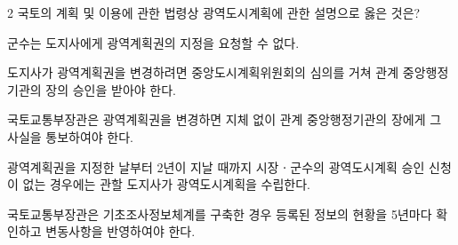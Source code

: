 \begin{question}{2}
국토의 계획 및 이용에 관한 법령상 광역도시계획에 관한 설명으로 옳은 것은?
\begin{choices}
  \item 군수는 도지사에게 광역계획권의 지정을 요청할 수 없다.
  \item 도지사가 광역계획권을 변경하려면 중앙도시계획위원회의 심의를 거쳐 관계 중앙행정기관의 장의 승인을 받아야 한다.
  \item 국토교통부장관은 광역계획권을 변경하면 지체 없이 관계 중앙행정기관의 장에게 그 사실을 통보하여야 한다.
  \item 광역계획권을 지정한 날부터 2년이 지날 때까지 시장ㆍ군수의 광역도시계획 승인 신청이 없는 경우에는 관할 도지사가 광역도시계획을 수립한다.
  \item 국토교통부장관은 기초조사정보체계를 구축한 경우 등록된 정보의 현황을 5년마다 확인하고 변동사항을 반영하여야 한다.
\end{choices}
\end{question}
